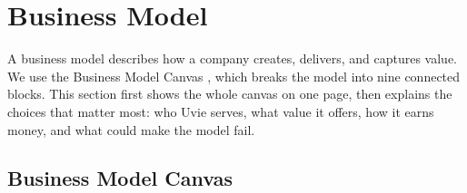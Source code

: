 \section{Business Model}\label{sec:business-model}

A business model describes how a company creates, delivers, and captures value.
We use the Business Model Canvas \cite{osterwalder2010}, which breaks the model into
nine connected blocks. This section first shows the whole canvas on one page, then
explains the choices that matter most: who Uvie serves, what value it offers, how it
earns money, and what could make the model fail.

\subsection{Business Model Canvas}

